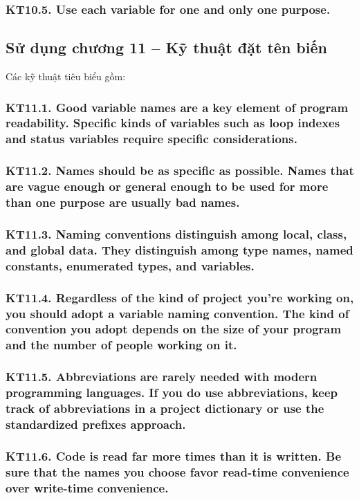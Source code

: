 \documentclass[12pt]{report}
\begin{document}
\subsubsection{KT10.5. Use each variable for one and only one purpose.}


\subsection{Sử dụng chương 11 -- Kỹ thuật đặt tên biến}
\noindent Các kỹ thuật tiêu biểu gồm:

\subsubsection{KT11.1. Good variable names are a key element of program readability. Specific kinds of variables such as loop indexes and status variables require specific considerations.}

\subsubsection{KT11.2. Names should be as specific as possible. Names that are vague enough or general enough to be used for more than one purpose are usually bad names.}

\subsubsection{KT11.3. Naming conventions distinguish among local, class, and global data. They distinguish among type names, named constants, enumerated types, and variables.}

\subsubsection{KT11.4. Regardless of the kind of project you're working on, you should adopt a variable naming convention. The kind of convention you adopt depends on the size of your program and the number of people working on it.}

\subsubsection{KT11.5. Abbreviations are rarely needed with modern programming languages. If you do use abbreviations, keep track of abbreviations in a project dictionary or use the standardized prefixes approach.}

\subsubsection{KT11.6. Code is read far more times than it is written. Be sure that the names you choose favor read-time convenience over write-time convenience.}
\end{document}
